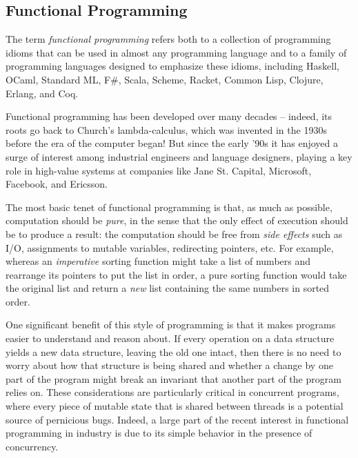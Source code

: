 \documentclass[12pt]{report}
\begin{document}
\subsection{Functional Programming}



 The term \textit{functional programming} refers both to a collection of
    programming idioms that can be used in almost any programming
    language and to a family of programming languages designed to
    emphasize these idioms, including Haskell, OCaml, Standard ML,
    F\#, Scala, Scheme, Racket, Common Lisp, Clojure, Erlang, and Coq.


    Functional programming has been developed over many decades --
    indeed, its roots go back to Church's lambda-calculus, which was
    invented in the 1930s before the era of the computer began!  But
    since the early '90s it has enjoyed a surge of interest among
    industrial engineers and language designers, playing a key role in
    high-value systems at companies like Jane St. Capital, Microsoft,
    Facebook, and Ericsson.


    The most basic tenet of functional programming is that, as much as
    possible, computation should be \textit{pure}, in the sense that the only
    effect of execution should be to produce a result: the computation
    should be free from \textit{side effects} such as I/O, assignments to
    mutable variables, redirecting pointers, etc.  For example,
    whereas an \textit{imperative} sorting function might take a list of
    numbers and rearrange its pointers to put the list in order, a
    pure sorting function would take the original list and return a
    \textit{new} list containing the same numbers in sorted order.


    One significant benefit of this style of programming is that it
    makes programs easier to understand and reason about.  If every
    operation on a data structure yields a new data structure, leaving
    the old one intact, then there is no need to worry about how that
    structure is being shared and whether a change by one part of the
    program might break an invariant that another part of the program
    relies on.  These considerations are particularly critical in
    concurrent programs, where every piece of mutable state that is
    shared between threads is a potential source of pernicious bugs.
    Indeed, a large part of the recent interest in functional
    programming in industry is due to its simple behavior in the
    presence of concurrency.
\end{document}
